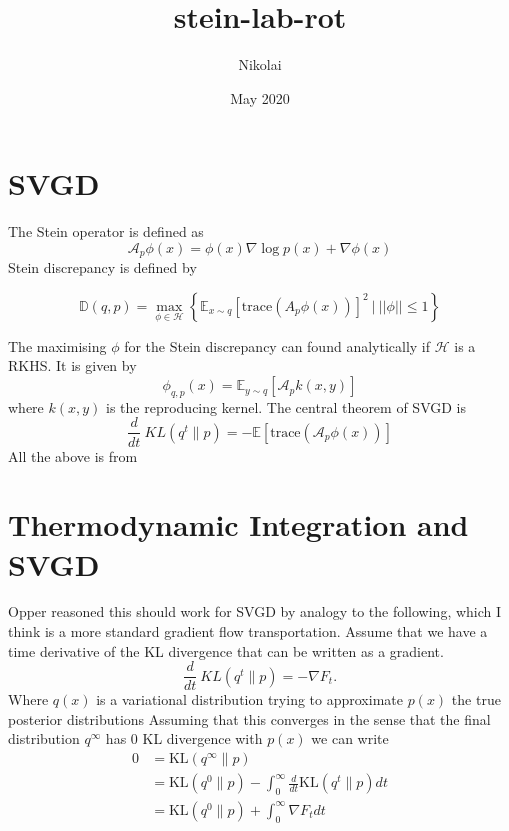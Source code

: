 \documentclass{article}
\title{stein-lab-rot}
\author{Nikolai }
\date{May 2020}
\begin{document}
\maketitle

\section{SVGD}
    The Stein operator is defined as
    \begin{equation}
        \label{eq:stein_operator}
        \mathcal{A}_p \phi(x) = \phi(x) \nabla \log p(x) + \nabla \phi(x)
    \end{equation}
    Stein discrepancy is defined by

    \begin{equation}
        \label{eq:stein_discrepancy}
        \mathbb{D}( q, p ) = \max_{ \phi \in \mathcal{H} } 
        \left\{ 
          \mathbb{E}_{ x \sim q } 
            \left[ 
                \text{trace} ( A_p \phi(x) ) 
            \right]^2
            \ | \ ||\phi|| \leq 1 
        \right\}
    \end{equation}

    The maximising $\phi$ for the Stein discrepancy can found analytically if $\mathcal{H}$ is a RKHS. It is given by
    \begin{equation}
        \label{eq:phi_max}
        \phi_{ q, p } (x) = \mathbb{E}_{ y \sim q } \left[ \mathcal{A}_p k(x, y) \right]
    \end{equation}
    where $k(x,y)$ is the reproducing kernel.
    The central theorem of SVGD is
    \begin{equation}
        \label{eq:svgd}
        \frac{d}{dt}\ KL( q^t \| p ) = - \mathbb{E} \left[ \text{trace} \left( \mathcal{A}_p \phi(x) \right) \right]
    \end{equation}
    All the above is from \cite{svgd}


\section{Thermodynamic Integration and SVGD}
    Opper reasoned this should work for SVGD by analogy to the following, which I think is a more standard gradient
    flow transportation. Assume that we have a time derivative of the KL divergence that can be written as a gradient.
    \begin{equation}
        \frac{d}{dt}\ KL( q^t \| p ) = - \nabla F_t.
    \end{equation}
    Where $q(x)$ is a variational distribution trying to approximate $p(x)$ the true posterior distributions
    Assuming that this converges in the sense that the final distribution $q^{\infty}$ has 0 KL divergence with 
    $p(x)$ we can write
    \begin{align}
    \label{eq:therm_int}
    0 &= \text{KL}( q^{\infty} \| p ) \\
    &= \text{KL} ( q^0 \| p ) - \int_0^{\infty} \frac{d}{dt} \text{KL} ( q^t \| p ) dt \\
    &= \text{KL}( q^0 \| p ) + \int_0^{\infty} \nabla F_t dt
    \end{align}
\end{document}
